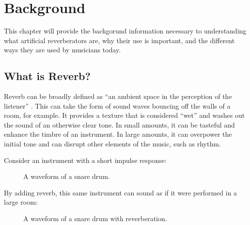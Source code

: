 \chapter{Background}
\hspace*{-0.155cm}This chapter will provide the backgorund information necessary to understanding what artificial reverberators are, why their use is important, and the different ways they are used by musicians today.

\section{What is Reverb?}
Reverb can be broadly defined as ``an ambient space in the perception of the listener'' \cite{dattorro1997effect}. This can take the form of sound waves bouncing off the walls of a room, for example. It provides a texture that is considered ``wet'' and washes out the sound of an otherwise clear tone. In small amounts, it can be tasteful and enhance the timbre of an instrument. In large amounts, it can overpower the initial tone and can disrupt other elements of the music, such as rhythm.

Consider an instrument with a short impulse response:

\begin{figure}[h] %
	\begin{center}
		\caption{A waveform of a snare drum.}
	\end{center}
\end{figure}

By adding reverb, this same instrument can sound as if it were performed in a large room:

\begin{figure}[h] %
	\begin{center}
		\caption{A waveform of a snare drum with reverberation.}
	\end{center}
\end{figure} %

